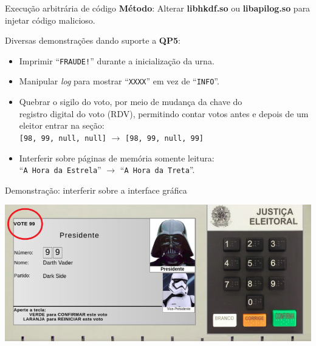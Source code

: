 \documentclass[10pt,xcolor={dvipsnames}]{beamer}
\begin{document}
\begin{frame}{Execução arbitrária de código}
  \textbf{Método}: Alterar \textbf{libhkdf.so} ou \textbf{libapilog.so} para injetar código malicioso.
  \vfill

  Diversas demonstrações dando suporte a \textbf{QP5}:

  \begin{itemize}
    \item Imprimir \alert{``\texttt{FRAUDE!}''} durante a inicialização da urna.
    \item Manipular \textit{log} para mostrar \alert{``\texttt{XXXX}''} em vez de \alert{``\texttt{INFO}''}.
    \item Quebrar o sigilo do voto, por meio de mudança da chave do\\registro digital do voto (RDV), permitindo contar votos antes e depois de um eleitor entrar na seção:\\[0.5em]

    \texttt{[98, 99, null, \alert{null}]} $\rightarrow$ \texttt{[98, 99, null, \alert{99}]}

    \item Interferir sobre páginas de memória somente leitura:\\\alert{``\texttt{A Hora da Estrela}''} $\rightarrow$ \alert{``\texttt{A Hora da Treta}''}.
  \end{itemize}
\end{frame}


\begin{frame}{Demonstração: interferir sobre a interface gráfica}
\begin{center}
\includegraphics[width=\textwidth,height=0.5\textheight,keepaspectratio]{tela-adulterada.png}
\end{center}
\end{frame}
\end{document}
